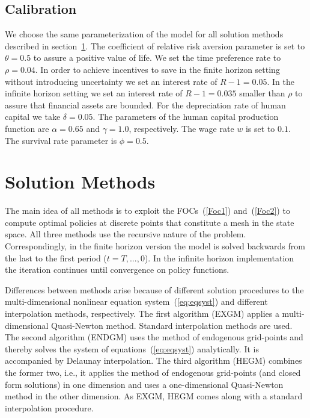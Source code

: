 \documentclass[a4paper,12pt]{article}%
\begin{document}
\subsection{Calibration}

We choose the same parameterization of the model for all solution methods described in section~\ref{s:solmeth}. The coefficient of relative risk aversion parameter is set to $\theta=0.5$ to assure a positive value of life. We set the time preference rate to $\rho=0.04$. In order to achieve incentives to save in the finite horizon setting without introducing uncertainty we set an interest rate of $R-1=0.05$. In the infinite horizon setting we set an interest rate of $R-1=0.035$ smaller than $\rho$ to assure that financial assets are bounded. For the depreciation rate of human capital we take $\delta=0.05.$ The parameters of the human capital production function are $\alpha=0.65$ and $\gamma=1.0$, respectively. The wage rate $w$ is set to $0.1$. The survival rate parameter is $\phi=0.5$.

\section{Solution Methods}
\label{s:solmeth}

The main idea of all methods is to exploit the FOCs~(\ref{Foc1}) and~(\ref{Foc2}) to compute optimal policies at discrete points that constitute a mesh in the state space. All three methods use the recursive nature of the problem. Correspondingly, in the finite horizon version the model is solved backwards from the last to the first period ($t=T,...,0$). In the infinite horizon implementation the iteration continues until convergence on policy functions.

Differences between methods arise because of different solution procedures to the multi-dimensional nonlinear equation system~(\ref{eq:eqsyst}) and different interpolation methods, respectively. The first algorithm (EXGM) applies a multi-dimensional Quasi-Newton method. Standard interpolation methods are used. The second algorithm (ENDGM) uses the method of endogenous grid-points and thereby solves the system of equations~(\ref{eq:eqsyst}) analytically. It is accompanied by Delaunay interpolation. The third algorithm (HEGM) combines the former two, i.e., it applies the method of endogenous grid-points (and closed form solutions) in one dimension and uses a one-dimensional Quasi-Newton method in the other dimension. As EXGM, HEGM comes along with a standard interpolation procedure.
\end{document}
